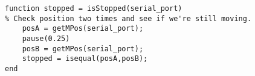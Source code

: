 \begin{lstlisting}
function stopped = isStopped(serial_port)
% Check position two times and see if we're still moving.
    posA = getMPos(serial_port);
    pause(0.25)
    posB = getMPos(serial_port);
    stopped = isequal(posA,posB);
end

\end{lstlisting}